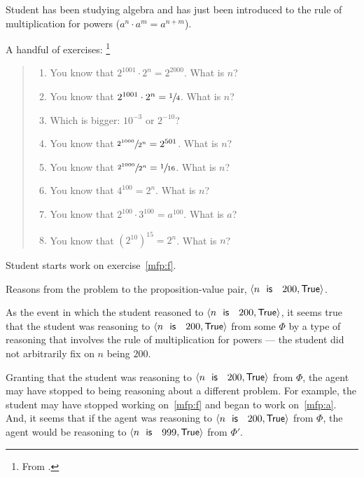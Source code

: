\begin{note}
  \begin{illustration}[Textbook]
    Student has been studying algebra and has just been introduced to the rule of multiplication for powers (\(a^{n} \cdot a^{m} = a^{n + m}\)).

    A handful of exercises:%
    \footnote{
      From \textcite[31]{Gelfand:1993aa}.
    }

    \begin{quote}
      \begin{enumerate}[label=(\alph*), ref=(\alph*)]
      \item
        \label{mfp:a}
        You know that \(2^{1001} \cdot 2^{n} = 2^{2000}\).
        What is \(n\)?
      \item
        \label{mfp:b}
        You know that \(2^{1001} \cdot 2^{n} = \sfrac{1}{4}\).
        What is \(n\)?
      \item
        \label{mfp:c}
        Which is bigger: \(10^{-3}\) or \(2^{-10}\)?
      \item
        \label{mfp:d}
        You know that \(\sfrac{2^{1000}}{2^{n}} = 2^{501}\).
        What is \(n\)?
      \item
        \label{mfp:e}
        You know that \(\sfrac{2^{1000}}{2^{n}} = \sfrac{1}{16}\).
        What is \(n\)?
      \item
        \label{mfp:f}
        You know that \(4^{100} = 2^{n}\).
        What is \(n\)?
      \item
        \label{mfp:g}
        You know that \(2^{100} \cdot 3^{100} = a^{100}\).
        What is \(a\)?
      \item
        \label{mfp:h}
        You know that \((2^{10})^{15} = 2^{n}\).
        What is \(n\)?
      \end{enumerate}
    \end{quote}

    Student starts work on exercise~\ref{mfp:f}.

    Reasons from the problem to the proposition-value pair, \(\pv{n\prop{ is }200}{\val{True}}\).

    As the event in which the student reasoned to \(\pv{n\prop{ is }200}{\val{True}}\), it seems true that the student was reasoning to \(\pv{n\prop{ is }200}{\val{True}}\) from some \pool{} \(\Phi\) by a type of reasoning that involves the rule of multiplication for powers --- the student did not arbitrarily fix on \(n\) being \(200\).

    Granting that the student was reasoning to \(\pv{n\prop{ is }200}{\val{True}}\) from \(\Phi\), the agent may have stopped to being reasoning about a different problem.
    For example, the student may have stopped working on~\ref{mfp:f} and began to work on~\ref{mfp:a}.
    And, it seems that if the agent was reasoning to \(\pv{n\prop{ is }200}{\val{True}}\) from \(\Phi\), the agent would be reasoning to \(\pv{n\prop{ is }999}{\val{True}}\) from \(\Phi'\).


\end{illustration}
\end{note}
